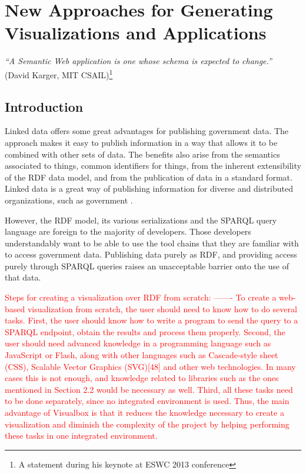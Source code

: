 \chapter{New Approaches for Generating Visualizations and Applications}
\label{ch:ch5}

\begin{flushright}
\textit{``A Semantic Web application is one whose schema is expected to change.''} \\ (David Karger, MIT CSAIL)\footnote{A statement during his keynote at ESWC 2013 conference}
\end{flushright}


\section{Introduction}
\label{sec:introch5}

Linked data offers some great advantages for publishing government data. The approach makes it easy to publish information in a way that allows it to be combined with other sets of data. The benefits also arise from the semantics associated to things, common identifiers for things, from the inherent extensibility of the RDF data model, and from the publication of data in a standard format. Linked data is a great way of publishing information for diverse and distributed organizations, such as government \cite{tennison10}.  

However, the RDF model, its various serializations and the SPARQL query language are foreign to the majority of developers. Those developers understandably want to be able to use the tool chains that they are familiar with to access government data. Publishing data purely as RDF, and providing access purely through SPARQL queries raises an unacceptable barrier onto the use of that data. 

\textcolor{red}{Steps for creating a visualization over RDF from scratch: 
-------
To create a web-based visualization from scratch, the user should need to know how to do several tasks. First, the user should know how to write a program to send the query to a SPARQL endpoint, obtain the results and process them properly. Second, the user should need advanced knowledge in a programming language such as JavaScript or Flash, along with other languages such as Cascade-style sheet (CSS), Scalable Vector Graphics (SVG)[48] and other web technologies. In many cases this is not enough, and knowledge related to libraries such as the ones mentioned in Section 2.2 would be necessary as well. Third, all these tasks need to be done separately, since no integrated environment is used. Thus, the main advantage of Visualbox is that it reduces the knowledge necessary to create a visualization and diminish the complexity of the project by helping performing these tasks in one integrated environment.}


